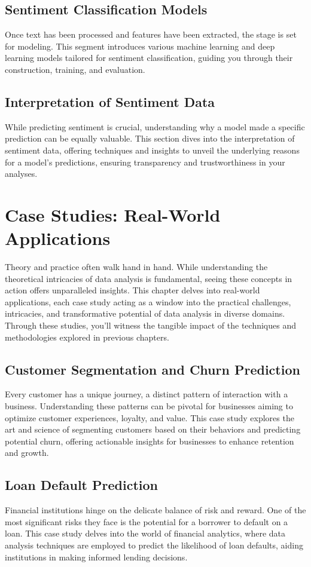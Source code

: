 \documentclass[a4paper,12pt]{book}
\begin{document}
\section{Sentiment Classification Models}
Once text has been processed and features have been extracted, the stage is set for modeling. This segment introduces various machine learning and deep learning models tailored for sentiment classification, guiding you through their construction, training, and evaluation.

\section{Interpretation of Sentiment Data}
While predicting sentiment is crucial, understanding why a model made a specific prediction can be equally valuable. This section dives into the interpretation of sentiment data, offering techniques and insights to unveil the underlying reasons for a model's predictions, ensuring transparency and trustworthiness in your analyses.

\chapter{Case Studies: Real-World Applications}
Theory and practice often walk hand in hand. While understanding the theoretical intricacies of data analysis is fundamental, seeing these concepts in action offers unparalleled insights. This chapter delves into real-world applications, each case study acting as a window into the practical challenges, intricacies, and transformative potential of data analysis in diverse domains. Through these studies, you'll witness the tangible impact of the techniques and methodologies explored in previous chapters.

\section{Customer Segmentation and Churn Prediction}
Every customer has a unique journey, a distinct pattern of interaction with a business. Understanding these patterns can be pivotal for businesses aiming to optimize customer experiences, loyalty, and value. This case study explores the art and science of segmenting customers based on their behaviors and predicting potential churn, offering actionable insights for businesses to enhance retention and growth.

\section{Loan Default Prediction}
Financial institutions hinge on the delicate balance of risk and reward. One of the most significant risks they face is the potential for a borrower to default on a loan. This case study delves into the world of financial analytics, where data analysis techniques are employed to predict the likelihood of loan defaults, aiding institutions in making informed lending decisions.
\end{document}
